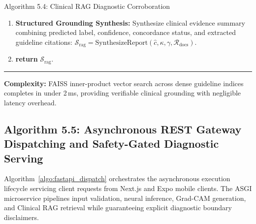 \documentclass[12pt,a4paper]{report}
\begin{document}
\begin{algoBox}{Algorithm 5.4: Clinical RAG Diagnostic Corroboration}
\begin{enumerate}[1:]
    \begin{equation*}
      \gamma = \begin{cases}
        \texttt{Strongly Supported} & \text{if } \kappa \ge 0.85 \text{ and } \bar{s} \ge 0.80 \\
        \texttt{Moderately Supported} & \text{if } \kappa \ge 0.60 \text{ and } \bar{s} \ge 0.65 \\
        \texttt{Requires Review} & \text{otherwise}
      \end{cases}
    \end{equation*}
  \item \textbf{Structured Grounding Synthesis:} Synthesize clinical evidence summary combining predicted label, confidence, concordance status, and extracted guideline citations: $\mathcal{S}_{\text{rag}} = \mathrm{SynthesizeReport}(\hat{c}, \kappa, \gamma, \mathcal{R}_{\text{docs}})$.
  \item \textbf{return} $\mathcal{S}_{\text{rag}}$.
\end{enumerate}
\noindent\rule{\linewidth}{0.4pt}
\textbf{Complexity:} FAISS inner-product vector search across dense guideline indices completes in under 2\,ms, providing verifiable clinical grounding with negligible latency overhead.
\end{algoBox}

\newpage
\subsection{Algorithm 5.5: Asynchronous REST Gateway Dispatching and Safety-Gated Diagnostic Serving}
Algorithm~\ref{algo:fastapi_dispatch} orchestrates the asynchronous execution lifecycle servicing client requests from Next.js and Expo mobile clients. The ASGI microservice pipelines input validation, neural inference, Grad-CAM generation, and Clinical RAG retrieval while guaranteeing explicit diagnostic boundary disclaimers.
\end{document}
